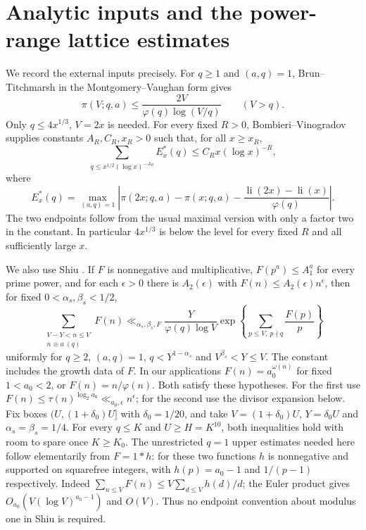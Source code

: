 \documentclass[10pt,reqno]{amsart}
\theoremstyle{remark}
\newcommand{\li}{\operatorname{li}}
\begin{document}
\section{Analytic inputs and the power-range lattice estimates}\label{sec:lattice}
We record the external inputs precisely.  For $q\geq1$ and $(a,q)=1$,
Brun--Titchmarsh in the Montgomery--Vaughan form \cite{MV} gives
\begin{equation}\label{eq:BT}
 \pi(V;q,a)\leq\frac{2V}{\varphi(q)\log(V/q)}\qquad(V>q).
\end{equation}
Only $q\leq4x^{1/3}$, $V=2x$ is needed.  For every fixed $R>0$,
Bombieri--Vinogradov \cite[Chapter~28]{Davenport} supplies constants
$A_R,C_R,x_R>0$ such that, for all $x\geq x_R$,
\begin{equation}\label{eq:BV}
 \sum_{q\leq x^{1/2}(\log x)^{-A_R}}E_x^*(q)
 \leq C_Rx(\log x)^{-R},
\end{equation}
where
\[
 E_x^*(q)=\max_{(a,q)=1}\left|
 \pi(2x;q,a)-\pi(x;q,a)-\frac{\li(2x)-\li(x)}{\varphi(q)}\right|.
\]
The two endpoints follow from the usual maximal version with only a factor
two in the constant.  In particular $4x^{1/3}$ is below the level for
every fixed $R$ and all sufficiently large $x$.

We also use Shiu \cite[Theorem~1, pp.~162--163]{Shiu}.
If $F$ is nonnegative and multiplicative,
$F(p^a)\leq A_1^a$ for every prime power, and for each $\epsilon>0$
there is $A_2(\epsilon)$ with $F(n)\leq A_2(\epsilon)n^\epsilon$, then
for fixed $0<\alpha_s,\beta_s<1/2$,
\begin{equation}\label{eq:Shiu}
 \sum_{\substack{V-Y<n\leq V\\n\equiv a\ (q)}}F(n)
 \ll_{\alpha_s,\beta_s,F}\frac{Y}{\varphi(q)\log V}
 \exp\left\{\sum_{p\leq V,\ p\nmid q}\frac{F(p)}p\right\}
\end{equation}
uniformly for $q\geq2$, $(a,q)=1$, $q<Y^{1-\alpha_s}$ and
$V^{\beta_s}<Y\leq V$.  The constant includes the growth data of $F$.
In our applications $F(n)=a_0^{\omega(n)}$ for fixed $1<a_0<2$, or
$F(n)=n/\varphi(n)$.  Both satisfy these hypotheses.  For the first use
$F(n)\leq\tau(n)^{\log_2a_0}\ll_{a_0,\epsilon}n^\epsilon$;
for the second use the divisor expansion below.  Fix boxes
$(U,(1+\delta_0)U]$ with $\delta_0=1/20$, and take
$V=(1+\delta_0)U$, $Y=\delta_0 U$ and
$\alpha_s=\beta_s=1/4$.  For every $q\leq K$ and $U\geq H=K^{10}$,
both inequalities hold with room to spare once $K\geq K_0$.
The unrestricted $q=1$ upper estimates needed here follow elementarily
from $F=1*h$: for these two functions $h$ is nonnegative and supported
on squarefree integers, with $h(p)=a_0-1$ and $1/(p-1)$ respectively.
Indeed $\sum_{n\leq V}F(n)\leq V\sum_{d\leq V}h(d)/d$;
the Euler product gives $O_{a_0}(V(\log V)^{a_0-1})$ and $O(V)$.
Thus no endpoint convention about modulus one in Shiu is required.
\end{document}
